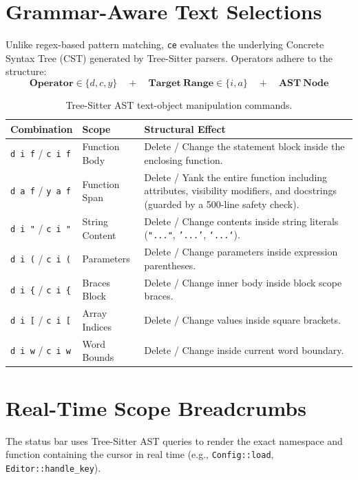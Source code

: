 \documentclass[11pt,a4paper,openany]{book}
\newcommand{\code}[1]{\colorbox{inlinebg}{\texttt{#1}}}
\begin{document}
\section{Grammar-Aware Text Selections}
Unlike regex-based pattern matching, \texttt{ce} evaluates the underlying Concrete Syntax Tree (CST) generated by Tree-Sitter parsers. Operators adhere to the structure:
$$\mathbf{Operator} \in \{d, c, y\} \quad+\quad \mathbf{Target\ Range} \in \{i, a\} \quad+\quad \mathbf{AST\ Node}$$

\begin{table}[htbp]
\centering
\small
\begin{tabularx}{\textwidth}{l l X}
\toprule
\textbf{Combination} & \textbf{Scope} & \textbf{Structural Effect} \\
\midrule
\code{d i f} / \code{c i f} & Function Body & Delete / Change the statement block inside the enclosing function. \\
\code{d a f} / \code{y a f} & Function Span & Delete / Yank the entire function including attributes, visibility modifiers, and docstrings (guarded by a 500-line safety check). \\
\code{d i "} / \code{c i "} & String Content & Delete / Change contents inside string literals (\code{"..."}, \code{'...'}, \code{`...`}). \\
\code{d i (} / \code{c i (} & Parameters & Delete / Change parameters inside expression parentheses. \\
\code{d i \{} / \code{c i \{} & Braces Block & Delete / Change inner body inside block scope braces. \\
\code{d i [} / \code{c i [} & Array Indices & Delete / Change values inside square brackets. \\
\code{d i w} / \code{c i w} & Word Bounds & Delete / Change inside current word boundary. \\
\bottomrule
\end{tabularx}
\caption{Tree-Sitter AST text-object manipulation commands.}
\end{table}

\section{Real-Time Scope Breadcrumbs}
The status bar uses Tree-Sitter AST queries to render the exact namespace and function containing the cursor in real time (e.g., \code{Config::load}, \code{Editor::handle\_key}).

\end{document}
